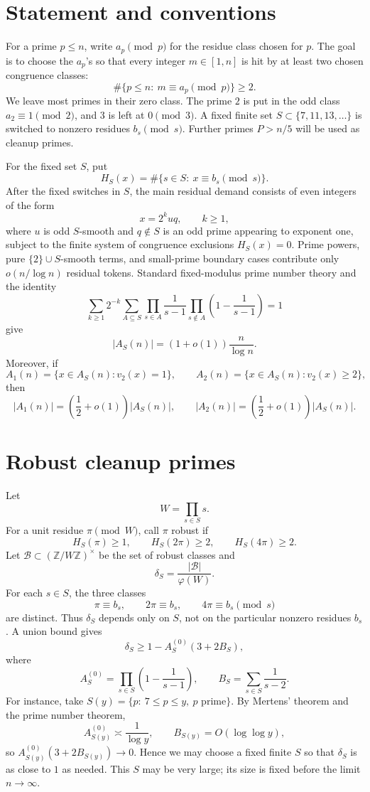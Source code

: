 \documentclass[11pt]{article}
\newcommand{\B}{\mathcal B}
\begin{document}
\section{Statement and conventions}

For a prime \(p\le n\), write \(a_p \pmod p\) for the residue class chosen for
\(p\).  The goal is to choose the \(a_p\)'s so that every integer
\(m\in[1,n]\) is hit by at least two chosen congruence classes:
\[
  \#\{p\le n:\ m\equiv a_p \pmod p\}\ge 2.
\]
We leave most primes in their zero class.  The prime \(2\) is put in the odd
class \(a_2\equiv1\pmod 2\), and \(3\) is left at \(0\pmod 3\).  A fixed finite
set \(S\subset\{7,11,13,\ldots\}\) is switched to nonzero residues
\(b_s\pmod s\).  Further primes \(P>n/5\) will be used as cleanup primes.

For the fixed set \(S\), put
\[
  H_S(x)=\#\{s\in S:\ x\equiv b_s\pmod s\}.
\]
After the fixed switches in \(S\), the main residual demand consists of even
integers of the form
\[
  x=2^k u q,\qquad k\ge1,
\]
where \(u\) is odd \(S\)-smooth and \(q\notin S\) is an odd prime appearing to
exponent one, subject to the finite system of congruence exclusions
\(H_S(x)=0\).  Prime powers, pure
\(\{2\}\cup S\)-smooth terms, and small-prime boundary cases contribute only
\(o(n/\log n)\) residual tokens.  Standard fixed-modulus prime number theory
and the identity
\[
  \sum_{k\ge1}2^{-k}
  \sum_{A\subseteq S}
  \prod_{s\in A}\frac1{s-1}
  \prod_{s\notin A}\left(1-\frac1{s-1}\right)=1
\]
give
\[
  |A_S(n)|=(1+o(1))\frac n{\log n}.
\]
Moreover, if
\[
  A_1(n)=\{x\in A_S(n):v_2(x)=1\},\qquad
  A_2(n)=\{x\in A_S(n):v_2(x)\ge2\},
\]
then
\[
  |A_1(n)|=\left(\frac12+o(1)\right)|A_S(n)|,\qquad
  |A_2(n)|=\left(\frac12+o(1)\right)|A_S(n)|.
\]

\section{Robust cleanup primes}

Let
\[
  W=\prod_{s\in S}s.
\]
For a unit residue \(\pi\pmod W\), call \(\pi\) robust if
\[
  H_S(\pi)\ge1,\qquad H_S(2\pi)\ge2,\qquad H_S(4\pi)\ge2.
\]
Let \(\B\subset(\mathbb Z/W\mathbb Z)^\times\) be the set of robust classes and
\[
  \delta_S=\frac{|\B|}{\varphi(W)}.
\]
For each \(s\in S\), the three classes
\[
  \pi\equiv b_s,\qquad 2\pi\equiv b_s,\qquad 4\pi\equiv b_s\pmod s
\]
are distinct.  Thus \(\delta_S\) depends only on \(S\), not on the particular
nonzero residues \(b_s\).  A union bound gives
\[
  \delta_S\ge 1-A_S^{(0)}(3+2B_S),
\]
where
\[
  A_S^{(0)}=\prod_{s\in S}\left(1-\frac1{s-1}\right),\qquad
  B_S=\sum_{s\in S}\frac1{s-2}.
\]
For instance, take \(S(y)=\{p:\ 7\le p\le y,\ p\text{ prime}\}\).  By Mertens'
theorem and the prime number theorem,
\[
  A_{S(y)}^{(0)}\asymp\frac1{\log y},\qquad
  B_{S(y)}=O(\log\log y),
\]
so \(A_{S(y)}^{(0)}(3+2B_{S(y)})\to0\).  Hence we may choose a fixed finite
\(S\) so that \(\delta_S\) is as close to \(1\) as needed.  This \(S\) may be
very large; its size is fixed before the limit \(n\to\infty\).
\end{document}

